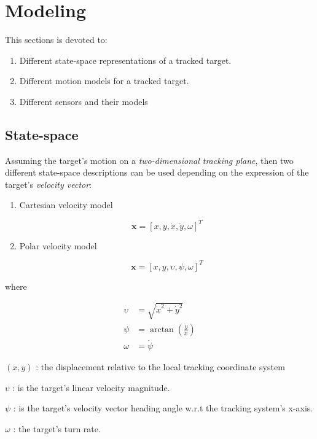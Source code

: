 \chapter{Modeling}
This sections is devoted to:

\begin{enumerate}
	\item Different state-space representations of a tracked target.
	\item Different motion models for a tracked target.
	\item Different sensors and their models	
\end{enumerate}

\section{State-space}
Assuming the target's motion on a \emph{two-dimensional tracking plane}, then two different state-space descriptions can be used depending on the expression of the target's \emph{velocity vector}:

\begin{enumerate}
	\item Cartesian velocity model 
	
	$$\mathbf{x} = \left[x,y,\dot{x}, \dot{y},\omega\right]^{T} $$
		
	\item Polar velocity model 
	
	$$\mathbf{x} = \left[x,y,\upsilon, \psi,\omega\right]^{T} $$
		
\end{enumerate}

where

\begin{subequations}
	\begin{align}
		\upsilon &= \sqrt{\dot{x}^2 + \dot{y}^2}  \\
		\psi &= \arctan\left(\frac{\dot{y}}{\dot{x}}\right) \\
		\omega &= \dot{\psi}
	\end{align}
\end{subequations}

\begin{description}
	\item $(x,y)$ : the displacement relative to the local tracking coordinate system
	\item $\upsilon$ : is the target's linear velocity magnitude.
	\item $\psi$ : is the target's velocity vector heading angle w.r.t the tracking system's x-axis.
	\item $\omega$ : the target's turn rate.
\end{description}






